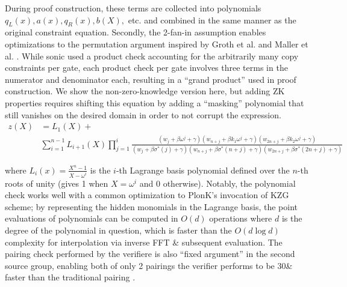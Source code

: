 \noindent During proof construction, these terms are collected into polynomials $q_L(x), a(x), q_R(x), b(X),$ etc. and combined in the same manner as the original constraint equation. Secondly, the 2-fan-in assumption enables optimizations to the permutation argument inspired by Groth et al. and Maller et al. \cite{grothshuffle, sonic}. While sonic used a product check accounting for the arbitrarily many copy constraints per gate, each product check per gate involves three terms in the numerator and denominator each, resulting in a ``grand product'' used in proof construction. We show the non-zero-knowledge version here, but adding ZK properties requires shifting this equation by adding a ``masking'' polynomial that still vanishes on the desired domain in order to not corrupt the expression.
\begin{align}
    z(X) &= L_1(X) + \\
    &\sum_{i=1}^{n-1} L_{i+1}(X) \prod_{j=1}^{i} \frac{(w_j + \beta\omega^j + \gamma)(w_{n+j} + \beta k_1\omega^j + \gamma)(w_{2n+j} + \beta k_2\omega^j + \gamma)}{(w_j + \beta\sigma^*(j) + \gamma)(w_{n+j} + \beta\sigma^*(n+j) + \gamma)(w_{2n+j} + \beta\sigma^*(2n+j) + \gamma)}
\end{align}

\noindent where $L_i(x) = \frac{X^n - 1}{X - \omega^i}$ is the $i$-th Lagrange basis polynomial defined over the $n$-th roots of unity (gives 1 when $X = \omega^i$ and 0 otherwise). Notably, the polynomial check works well with a common optimization to PlonK's invocation of KZG scheme; by representing the hidden monomials in the Lagrange basis, the point evaluations of polynomials can be computed in $O(d)$ operations where $d$ is the degree of the polynomial in question, which is faster than the $O(d \log d)$ complexity for interpolation via inverse FFT \& subsequent evaluation. The pairing check performed by the verifiere is also ``fixed argument'' in the second source group, enabling both of only 2 pairings the verifier performs to be 30\& faster than the traditional pairing \cite{fapairings}.\\


